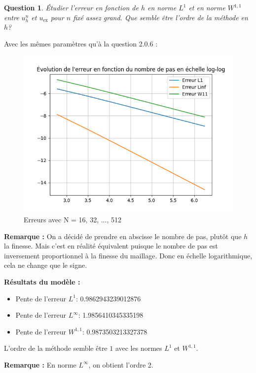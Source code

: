 \documentclass{article}
\newtheorem{question}{Question}[subsection]
\newenvironment{answer}
  {\color{blue}}
  {}
\newcommand{\QuestionAnswer}[2]{
    \begin{question}
        #1
    \end{question}
    \begin{answer}
        #2
    \end{answer}
}
\begin{document}
\QuestionAnswer{
    Étudier l'erreur en fonction de $h$ en norme $L^1$ et en norme $W^{1,1}$ entre $u^n_h$ et $u_{\text{ex}}$ pour $n$ fixé assez grand. Que semble être l'ordre de la méthode en $h$?
}{
    Avec les mêmes paramètres qu'à la question 2.0.6 :
    
    \begin{figure}[H]
        \centering
        \includegraphics[width=0.75\linewidth]{errorsWith128.png}
        \caption{Erreurs avec N = 16, 32, ..., 512}
        \label{fig:errors_N128}
    \end{figure}

    \textbf{Remarque :} On a décidé de prendre en abscisse le nombre de pas, plutôt que $h$ la finesse. Mais c'est en réalité équivalent puisque le nombre de pas est inversement proportionnel à la finesse du maillage. Donc en échelle logarithmique, cela ne change que le signe.

    \textbf{Résultats du modèle :}
    \begin{itemize}
        \item Pente de l'erreur $L^1$:   0.9862943239012876
        \item Pente de l'erreur $L^{\infty}$: 1.9856410345335198
        \item Pente de l'erreur $W^{1,1}$:  0.9873503213327378
    \end{itemize}

    L'ordre de la méthode semble être $1$ avec les normes $L^1$ et $W^{1,1}$.

    \textbf{Remarque :} En norme $L^{\infty}$, on obtient l'ordre 2.
}
\end{document}
